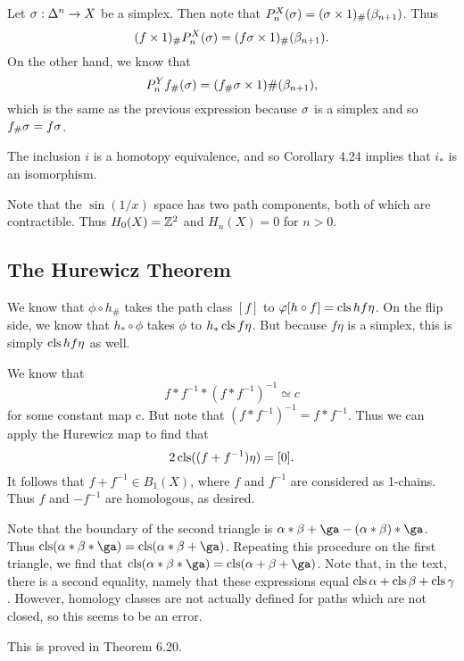 \documentclass[../../solutions.tex]{subfiles}
\begin{document}
\begin{exercise} \leavevmode
Let $\sigma:\Delta^n\to X$ be a simplex. 
Then note that $P_n^X(\sigma)=(\sigma\times1)_\#(\beta_{n+1})$. 
Thus \[(f\times1)_\#P_n^X(\sigma)=(f\sigma\times1)_\#(\beta_{n+1}).\]
On the other hand, we know that \[P_n^Yf_\#(\sigma)=(f_\#\sigma\times1)\#(\beta_{n+1}),\] which is the same as the previous expression because $\sigma$ is a simplex and so $f_\#\sigma=f\sigma$. 
\end{exercise}

\begin{exercise} \leavevmode
The inclusion $i$ is a homotopy equivalence, and so Corollary 4.24 implies that $i_*$ is an isomorphism. 
\end{exercise}

\begin{exercise} \leavevmode
Note that the $\sin(1/x)$ space has two path components, both of which are contractible. 
Thus $H_0(X)=\mathbb{Z}^2$ and $H_n(X)=0$ for $n>0$. 
\end{exercise}

\subsection{The Hurewicz Theorem}
\begin{exercise} \leavevmode
We know that $\phi\circ h_\#$ takes the path class $[f]$ to $\varphi[h\circ f]=\operatorname{cls} hf\eta$. 
On the flip side, we know that $h_*\circ\phi$ takes $\phi$ to $h_*\operatorname{cls} f\eta$. But because $f\eta$ is a simplex, this is simply $\operatorname{cls} hf\eta$ as well. 
\end{exercise}

\begin{exercise} \leavevmode
We know that \[f*f^{-1}*(f*f^{-1})^{-1}\simeq c\] for some constant map c. 
But note that $(f*f^{-1})^{-1}=f*f^{-1}$. 
Thus we can apply the Hurewicz map to find that \[2\operatorname{cls}((f+f^{-1})\eta)=[0].\] 
It follows that $f+f^{-1}\in B_1(X)$, where $f$ and $f^{-1}$ are considered as 1-chains. 
Thus $f$ and $-f^{-1}$ are homologous, as desired. 
\end{exercise}

\begin{exercise} \leavevmode
Note that the boundary of the second triangle is $\alpha*\beta+\ga-(\alpha*\beta)*\ga$. 
Thus $\cls(\alpha*\beta*\ga)=\cls(\alpha*\beta+\ga)$. 
Repeating this procedure on the first triangle, we find that $\cls(\alpha*\beta*\ga)=\cls(\alpha+\beta+\ga)$. 
Note that, in the text, there is a second equality, namely that these expressions equal $\operatorname{cls}\alpha+\operatorname{cls}\beta+\operatorname{cls}\gamma$. 
However, homology classes are not actually defined for paths which are not closed, so this seems to be an error. 
\end{exercise}

\begin{exercise} \leavevmode
This is proved in Theorem 6.20. 
\end{exercise}
\end{document}
